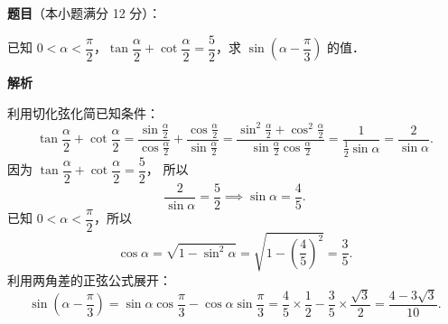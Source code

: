 \begin{answer}

\textbf{题目}（本小题满分 12 分）：

已知 $0 < \alpha < \dfrac{\pi}{2}$，$\tan\dfrac{\alpha}{2} + \cot\dfrac{\alpha}{2} = \dfrac{5}{2}$，求 $\sin\left(\alpha - \dfrac{\pi}{3}\right)$ 的值．

\textbf{解析}

利用切化弦化简已知条件：
\nopagebreak[4]
\[
\tan\frac{\alpha}{2} + \cot\frac{\alpha}{2} = \frac{\sin\frac{\alpha}{2}}{\cos\frac{\alpha}{2}} + \frac{\cos\frac{\alpha}{2}}{\sin\frac{\alpha}{2}} = \frac{\sin^2\frac{\alpha}{2} + \cos^2\frac{\alpha}{2}}{\sin\frac{\alpha}{2}\cos\frac{\alpha}{2}} = \frac{1}{\frac{1}{2}\sin\alpha} = \frac{2}{\sin\alpha}.
\]
因为 $\tan\dfrac{\alpha}{2} + \cot\dfrac{\alpha}{2} = \dfrac{5}{2}$，
所以
\nopagebreak[4]
\[
\frac{2}{\sin\alpha} = \frac{5}{2} \implies \sin\alpha = \frac{4}{5}.
\]
已知 $0 < \alpha < \dfrac{\pi}{2}$，所以
\nopagebreak[4]
\[
\cos\alpha = \sqrt{1 - \sin^2\alpha} = \sqrt{1 - \left(\frac{4}{5}\right)^2} = \frac{3}{5}.
\]
利用两角差的正弦公式展开：
\nopagebreak[4]
\[
\sin\left(\alpha - \frac{\pi}{3}\right) = \sin\alpha \cos\frac{\pi}{3} - \cos\alpha \sin\frac{\pi}{3} = \frac{4}{5} \times \frac{1}{2} - \frac{3}{5} \times \frac{\sqrt{3}}{2} = \frac{4 - 3\sqrt{3}}{10}.
\]


\end{answer}

